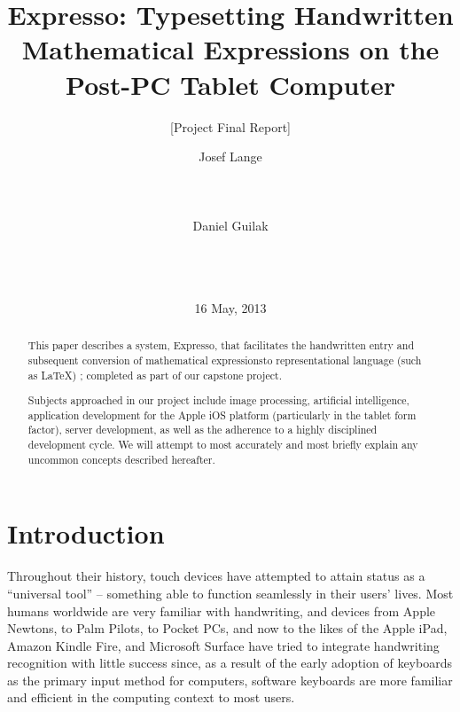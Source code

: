 \documentclass{acm_proc_article-sp}
\begin{document}
\title{ Expresso: Typesetting Handwritten Mathematical Expressions on the Post-PC Tablet Computer }
\subtitle{ [Project Final Report] }


\author{
\alignauthor
Josef Lange\\
       \\
       \\
       \\
\alignauthor       
Daniel Guilak\\
       \\
       \\
       \\
}
       
\date{16 May, 2013}

\maketitle

\begin{abstract}
This paper describes a system, Expresso, that facilitates the handwritten entry and subsequent conversion of mathematical expressionsto representational language (such as \LaTeX{}) ; completed as part of our capstone project.

Subjects approached in our project include image processing, artificial intelligence, application development for the Apple iOS platform (particularly in the tablet form factor), server development, as well as the adherence to a highly disciplined development cycle. We will attempt to most accurately and most briefly explain any uncommon concepts described hereafter.
\end{abstract}

\section{Introduction}
Throughout their history, touch devices have attempted to attain status as a ``universal tool'' -- something able to function seamlessly in their users' lives. Most humans worldwide are very familiar with handwriting, and devices from Apple Newtons, to Palm Pilots, to Pocket PCs, and now to the likes of the Apple iPad, Amazon Kindle Fire, and Microsoft Surface have tried to integrate handwriting recognition with little success since, as a result of the early adoption of keyboards as the primary input method for computers, software keyboards are more familiar and efficient in the computing context to most users.
\end{document}
